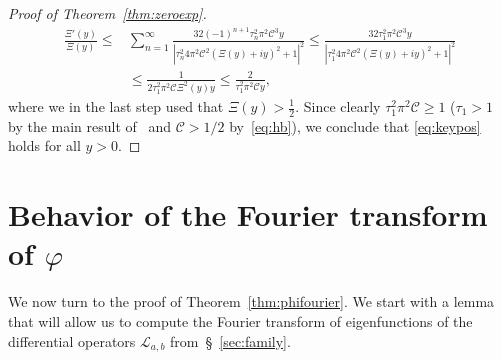 \documentclass[12pt]{amsart}
\theoremstyle{plain}
\numberwithin{equation}{section}
\theoremstyle{definition}
\renewcommand{\phi}{\varphi}
\newcommand{\Cone}{\mathscr{C}}
\begin{document}
\begin{proof}[Proof of Theorem~\ref{thm:zeroexp}]
\begin{align*}   \frac{\Xi'(y)}{\Xi(y)} \le & \sum_{n=1}^\infty \frac{32 (-1)^{n+1}\tau_n^2 \pi^2 \Cone^3  y}{|\tau_n^2  4\pi^2 \Cone^2(\Xi(y)+iy)^2+1|^2} \le \frac{32 \tau_1^2 \pi^2 \Cone^3  y}{|\tau_1^2  4\pi^2 \Cone^2(\Xi(y)+iy)^2+1|^2} \\
& \le \frac{1}{2  \tau_1^2 \pi^2 \Cone \Xi^2(y) y} \le \frac{2}{ \tau_1^2 \pi^2 \Cone  y} ,  \end{align*}
where we in the last step used that $\Xi(y)>\frac12$. Since clearly $ \tau_1^2 \pi^2 \Cone\ge 1$ ($\tau_1>1$ by the main result of~\cite{BORS} and $\Cone>1/2$ by~\eqref{eq:hb}), we conclude that \eqref{eq:keypos} holds for all $y>0$.
\end{proof}




\section{Behavior of the Fourier transform of \texorpdfstring{$\phi$}{phi}}
\label{sec:phihat}
We now turn to the proof of Theorem~\ref{thm:phifourier}.
We start with a lemma that will allow us to compute the Fourier transform of eigenfunctions of the differential operators $\mathcal{L}_{a,b}$ from~\S~\ref{sec:family}.
\end{document}

